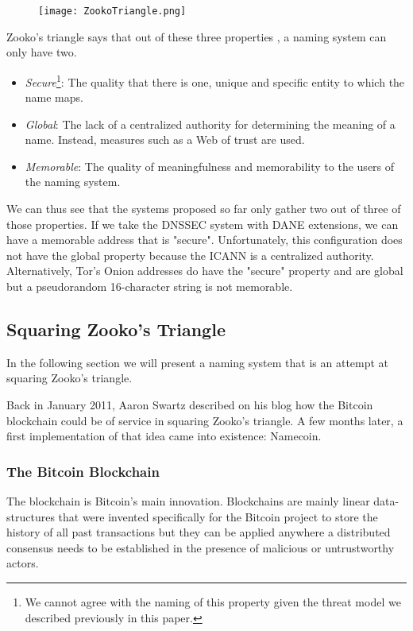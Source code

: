 \documentclass{vldb}
\begin{document}
\begin{figure}[h!]
\centering
\texttt{[image: ZookoTriangle.png]}
\end{figure}

Zooko's triangle says that out of these three properties \cite{zookoTriangleWikipedia}, a naming system can only have two.
\begin{itemize}
\item \emph{Secure}\footnote{We cannot agree with the naming of this property given the threat model we described previously in this paper.}: The quality that there is one, unique and specific entity to which the name maps.
\item \emph{Global}: The lack of a centralized authority for determining the meaning of a name. Instead, measures such as a Web of trust are used.
\item \emph{Memorable}: The quality of meaningfulness and memorability to the users of the naming system.
\end{itemize}

We can thus see that the systems proposed so far only gather two out of three of those properties. If we take the DNSSEC system with DANE extensions, we can have a memorable address that is "secure". Unfortunately, this configuration does not have the global property because the ICANN is a centralized authority. Alternatively, Tor's Onion addresses do have the "secure" property and are global but a pseudorandom 16-character string is not memorable.

\subsection{Squaring Zooko's Triangle}

In the following section we will present a naming system that is an attempt at squaring Zooko's triangle.

Back in January 2011, Aaron Swartz described on his blog\cite{aaronBlog} how the Bitcoin blockchain could be of service in squaring Zooko's triangle. A few months later, a first implementation of that idea came into existence: Namecoin.

\subsubsection{The Bitcoin Blockchain}

The blockchain is Bitcoin's main innovation. Blockchains are mainly linear data-structures that were invented specifically for the Bitcoin project to store the history of all past transactions but they can be applied anywhere a distributed consensus needs to be established in the presence of malicious or untrustworthy actors.
\end{document}
